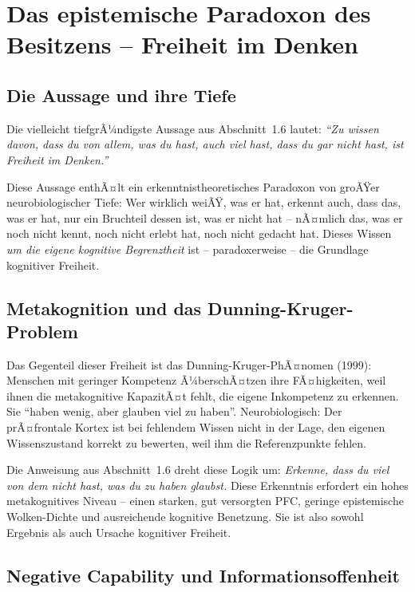 ﻿\documentclass[12pt,a4paper]{report}
\theoremstyle{plain}
\theoremstyle{definition}
\theoremstyle{remark}
\begin{document}
	\section{Das epistemische Paradoxon des Besitzens -- Freiheit im Denken}

	\subsection{Die Aussage und ihre Tiefe}

	Die vielleicht tiefgrÃ¼ndigste Aussage aus Abschnitt~1.6 lautet:
	\emph{``Zu wissen davon, dass du von allem, was du hast, auch viel hast,
	dass du gar nicht hast, ist Freiheit im Denken.''}

	Diese Aussage enthÃ¤lt ein erkenntnistheoretisches Paradoxon
	von groÃŸer neurobiologischer Tiefe:
	Wer wirklich weiÃŸ, was er hat, erkennt auch,
	dass das, was er hat, nur ein Bruchteil dessen ist,
	was er nicht hat -- nÃ¤mlich das, was er noch nicht kennt,
	noch nicht erlebt hat, noch nicht gedacht hat.
	Dieses Wissen \emph{um die eigene kognitive Begrenztheit}
	ist -- paradoxerweise -- die Grundlage kognitiver Freiheit.

	\subsection{Metakognition und das Dunning-Kruger-Problem}

	Das Gegenteil dieser Freiheit ist das Dunning-Kruger-PhÃ¤nomen
	(1999): Menschen mit geringer Kompetenz Ã¼berschÃ¤tzen ihre
	FÃ¤higkeiten, weil ihnen die metakognitive KapazitÃ¤t fehlt,
	die eigene Inkompetenz zu erkennen. Sie ``haben wenig,
	aber glauben viel zu haben''. Neurobiologisch:
	Der prÃ¤frontale Kortex ist bei fehlendem Wissen
	nicht in der Lage, den eigenen Wissenszustand korrekt zu bewerten,
	weil ihm die Referenzpunkte fehlen.

	Die Anweisung aus Abschnitt~1.6 dreht diese Logik um:
	\emph{Erkenne, dass du viel von dem nicht hast, was du zu haben glaubst.}
	Diese Erkenntnis erfordert ein hohes metakognitives Niveau --
	einen starken, gut versorgten PFC, geringe epistemische Wolken-Dichte
	und ausreichende kognitive Benetzung.
	Sie ist also sowohl Ergebnis als auch Ursache kognitiver Freiheit.

	\subsection{Negative Capability und Informationsoffenheit}
\end{document}
